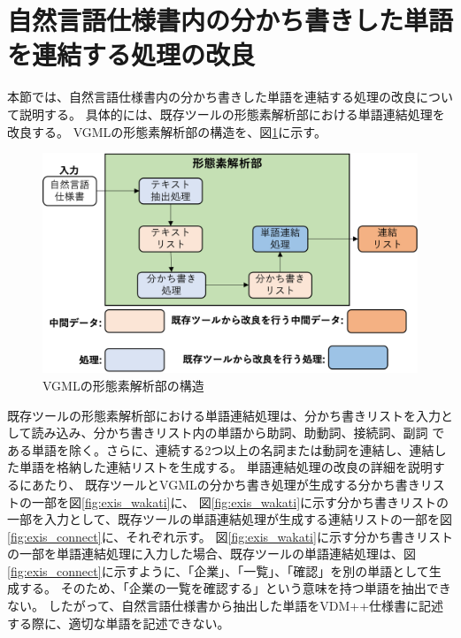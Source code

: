 \section{自然言語仕様書内の分かち書きした単語を連結する処理の改良}
本節では、自然言語仕様書内の分かち書きした単語を連結する処理の改良について説明する。
具体的には、既存ツールの形態素解析部における単語連結処理を改良する。
VGMLの形態素解析部の構造を、図\ref{fig:vgml_mor_structure}に示す。

\begin{figure}[t]
    \begin{center}
        \includegraphics[width=1.0\columnwidth]{image/vgml_mor_structure.png}
        \caption{VGMLの形態素解析部の構造}
        \label{fig:vgml_mor_structure}
    \end{center}
\end{figure}

既存ツールの形態素解析部における単語連結処理は、分かち書きリストを入力として読み込み、分かち書きリスト内の単語から助詞、助動詞、接続詞、副詞
である単語を除く。さらに、連続する2つ以上の名詞または動詞を連結し、連結した単語を格納した連結リストを生成する。
単語連結処理の改良の詳細を説明するにあたり、
既存ツールとVGMLの分かち書き処理が生成する分かち書きリストの一部を図\ref{fig:exis_wakati}に、
図\ref{fig:exis_wakati}に示す分かち書きリストの一部を入力として、既存ツールの単語連結処理が生成する連結リストの一部を図\ref{fig:exis_connect}に、それぞれ示す。
図\ref{fig:exis_wakati}に示す分かち書きリストの一部を単語連結処理に入力した場合、既存ツールの単語連結処理は、図\ref{fig:exis_connect}に示すように、「企業」、「一覧」、「確認」を別の単語として生成する。
そのため、「企業の一覧を確認する」という意味を持つ単語を抽出できない。
したがって、自然言語仕様書から抽出した単語をVDM++仕様書に記述する際に、適切な単語を記述できない。

